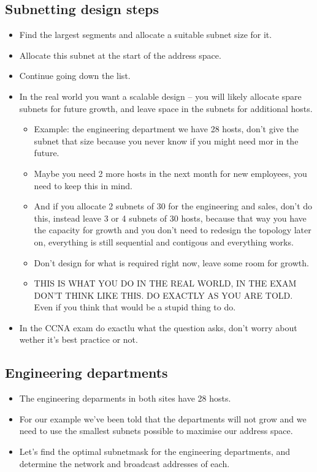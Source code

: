 \subsection{Subnetting design steps}
\begin{itemize}
    \item Find the largest segments and allocate a suitable subnet size for it.
    \item Allocate this subnet at the start of the address space.
    \item Continue going down the list.
    \item In the real world you want a scalable design -- you will likely allocate spare subnets for future growth, and leave space in the subnets for additional hosts.
        \begin{itemize}
            \item Example: the engineering department we have 28 hosts, don't give the subnet that size because you never know if you might need mor in the future.
            \item Maybe you need 2 more hosts in the next month for new employees, you need to keep this in mind.
            \item And if you allocate 2 subnets of 30 for the engineering and sales, don't do this, instead leave 3 or 4 subnets of 30 hosts, because that way you have the capacity for growth and you don't need to redesign the topology later on, everything is still sequential and contigous and everything works.
            \item Don't design for what is required right now, leave some room for growth.
            \item THIS IS WHAT YOU DO IN THE REAL WORLD, IN THE EXAM DON'T THINK LIKE THIS. DO EXACTLY AS YOU ARE TOLD. Even if you think that would be a stupid thing to do.
        \end{itemize}
    \item In the CCNA exam do exactlu what the question asks, don't worry about wether it's best practice or not.
\end{itemize}

\subsection{Engineering departments}
\begin{itemize}
    \item The engineering deparments in both sites have 28 hosts.
    \item For our example we've been told that the departments will not grow and we need to use the smallest subnets possible to maximise our address space.
    \item Let's find the optimal subnetmask for the engineering departments, and determine the network and broadcast addresses of each.
\end{itemize}


